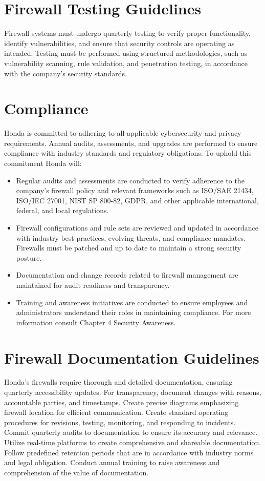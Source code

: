     \section{Firewall Testing Guidelines}
    Firewall systems must undergo quarterly testing to verify proper functionality, identify vulnerabilities, and ensure that security controls are operating as intended. Testing must be performed using structured methodologies, such as vulnerability scanning, rule validation, and penetration testing, in accordance with the company's security standards.

\section{Compliance}
Honda is committed to adhering to all applicable cybersecurity and privacy requirements. Annual audits, assessments, and upgrades are performed to ensure compliance with industry standards and regulatory obligations. To uphold this commitment Honda will:

\begin{itemize}
    \item Regular audits and assessments are conducted to verify adherence to the company’s firewall policy and relevant frameworks such as ISO/SAE 21434, ISO/IEC 27001, NIST SP 800-82, GDPR, and other applicable international, federal, and local regulations.
    
    \item Firewall configurations and rule sets are reviewed and updated in accordance with industry best practices, evolving threats, and compliance mandates. Firewalls must be patched and up to date to maintain a strong security posture.
    
    \item Documentation and change records related to firewall management are maintained for audit readiness and transparency.
    
    \item Training and awareness initiatives are conducted to ensure employees and administrators understand their roles in maintaining compliance. For more information consult Chapter 4 Security Awareness.

\end{itemize}
\section{Firewall Documentation Guidelines}
Honda's firewalls require thorough and detailed documentation, ensuring quarterly accessibility updates. For transparency, document changes with reasons, accountable parties, and timestamps. Create precise diagrams emphasizing firewall location for efficient communication. Create standard operating procedures for revisions, testing, monitoring, and responding to incidents. Commit quarterly audits to documentation to ensure its accuracy and relevance. Utilize real-time platforms to create comprehensive and shareable documentation. Follow predefined retention periods that are in accordance with industry norms and legal obligation. Conduct annual training to raise awareness and comprehension of the value of documentation.


